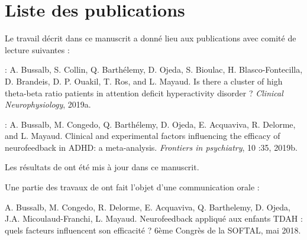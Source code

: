\section{Liste des publications}

Le travail décrit dans ce manuscrit a donné lieu aux publications avec comité de lecture suivantes :

\begin{description}
\item \citet{Bussalb2019tbr} : A. Bussalb, S. Collin, Q. Barthélemy, D. Ojeda, S. Bioulac, H. Blasco-Fontecilla,
D. Brandeis, D. P. Ouakil, T. Ros, and L. Mayaud. Is there a cluster of high
theta-beta ratio patients in attention deficit hyperactivity disorder ? \textit{Clinical Neurophysiology}, 2019a.
\item \citet{Bussalb2019clinical} : A. Bussalb, M. Congedo, Q. Barthélemy, D. Ojeda, E. Acquaviva, R. Delorme,
and L. Mayaud. Clinical and experimental factors influencing the efficacy of
neurofeedback in ADHD: a meta-analysis. \textit{Frontiers in psychiatry}, 10 :35, 2019b.
\end{description}

Les résultats de \citet{Bussalb2019clinical} ont été mis à jour dans ce manuscrit.

Une partie des travaux de \citet{Bussalb2019clinical} ont fait l'objet d'une communication orale :
\begin{description}
\item A. Bussalb, M. Congedo, R. Delorme, E. Acquaviva, Q. Barthelemy, D. Ojeda, J.A. Micoulaud-Franchi, L. Mayaud. Neurofeedback 
appliqué aux enfants TDAH : quels facteurs influencent son efficacité ? 6ème Congrès de la SOFTAL, mai 2018. 
\end{description}
